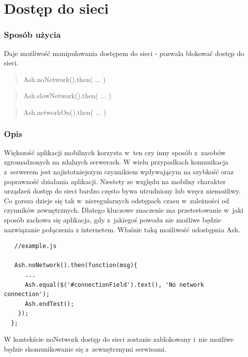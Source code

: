 \documentclass[brudnopis]{xmgr}
\begin{document}
\section{Dostęp do sieci}

\subsubsection{Sposób użycia}

Daje możliwość manipulowania dostępem do sieci - pozwala blokować dostęp do sieci.

\begin{quote}
Ash.noNetwork().then( ... ) 
\end{quote}

\begin{quote}
Ash.slowNetwork().then( ... ) 
\end{quote}

\begin{quote}
Ash.networkOn().then( ... ) 
\end{quote}

\subsubsection{Opis}

Większość aplikacji mobilnych korzysta w~ten czy inny sposób z~zasobów zgromadzonych na zdalnych serwerach. W wielu przypadkach komunikacja z~serwerem jest najistotniejszym czynnikiem wpływającym na szybkość oraz poprawność działania aplikacji. Niestety ze względu na mobilny charakter urządzeń dostęp do sieci bardzo często bywa utrudniony lub wręcz niemożliwy. Co gorsza dzieje się tak w~nieregularnych odstępach czasu w~zależności od czynników zewnętrznych. Dlatego kluczowe znaczenie ma przetestowanie w~jaki sposób zachowa się aplikacja, gdy z~jakiegoś powodu nie możliwe będzie nazwiązanie połączenia z internetem. Właśnie taką możliwość udostępnia Ash. 

\begin{lstlisting}
   //example.js

   Ash.noNetwork().then(function(msg){
      ...
      Ash.equal($('#connectionField').text(), 'No network connection');
      Ash.endTest();
    });
  };
\end{lstlisting}

W kontekście noNetwork dostęp do sieci zostanie zablokowany i~nie możliwe będzie skomunikowanie się z~zewnętrznymi serwisami.
\end{document}
